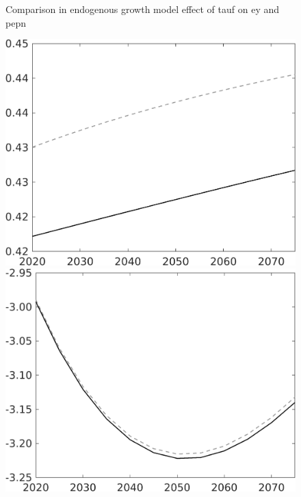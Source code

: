 \documentclass[12pt]{article}
\begin{document}
\begin{figure}{Comparison in endogenous growth model effect of tauf on ey and pepn }
\begin{minipage}[]{0.32\textwidth}
	\end{minipage}
	\begin{minipage}[]{0.32\textwidth}
		\includegraphics[width=1\textwidth]{../../codding_model/own_basedOnFried/optimalPol_010922_revision/figures/all_13Sept22/LevTaufNoTauf_TaulCalib_Equlab_regime0_EY_spillover0_nsk0_xgr0_knspil1_sep0_LFlimit0_emsbase0_countec0_GovRev0_etaa0.79_lgd0.png}
	\end{minipage}
	\begin{minipage}[]{0.32\textwidth}
		\includegraphics[width=1\textwidth]{../../codding_model/own_basedOnFried/optimalPol_010922_revision/figures/all_13Sept22/PerdifNoTauf_Equlab_regime0_CompTaul_EY_spillover0_nsk0_xgr0_knspil1_sep0_LFlimit0_emsbase0_countec0_GovRev0_etaa0.79_lgd0.png}

\end{minipage}
\end{figure}
\end{document}
